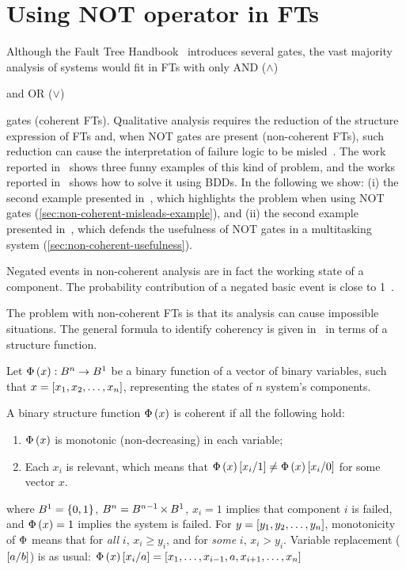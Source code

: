 \documentclass[en,twoside,onehalfspacing,phd]{risethesis}
\def\FThandbook{Fault Tree Handbook~\cite{VGR+1981}\index{Fault Tree!Handbook}%
  \gdef\FThandbook{Fault Tree Handbook\index{Fault Tree!Handbook}\xspace}%
  \xspace}
\def\ortext{OR ($\lor$)%
  \gdef\ortext{OR\xspace}%
  \xspace
}
\def\andtext{AND ($\land$)%
  \gdef\andtext{AND\xspace}%
  \xspace
}
\newcommand{\setsin}[1]{\ensuremath\left\{ #1 \right\}}
\newcommand{\parsin}[1]{\ensuremath\left( #1 \right)}
\newcommand{\squaresin}[1]{\ensuremath\left[ #1 \right]}
\def\cartesian{\ensuremath\operatorname{\times}}
\def\ftcoherencyop{\ensuremath\operatorname{\Phi}}
\newcommand{\ftcoherency}[1]{\ensuremath\ftcoherencyop\parsin{#1}}
\newcommand{\replace}[2]{\ensuremath\squaresin{#1\middle/#2}}
\begin{document}
\section[Using NOT operator in fault trees]{Using NOT operator in \aclp*{FT}}
\label{sec:not-operator}

Although the \FThandbook introduces several gates, the vast majority analysis of systems would fit in \acp{FT} with only \andtext and \ortext gates (coherent \acp{FT}).
Qualitative analysis requires the reduction of the structure expression of \acp{FT} and, when NOT gates are present (non-coherent \acp{FT}), such reduction can cause the interpretation of failure logic to be misled~\cite{Andrews2001,Oliv2006,AB2003,CCR2008,Vaurio2016}.
The work reported in~\cite{Oliv2006} shows three funny examples of this kind of problem, and the works reported in~\cite{Andrews2001,Oliv2006,CCR2008} shows how to solve it using \acp{BDD}.
In the following we show: (i) the second example presented in~\cite{Oliv2006}, which highlights the problem when using NOT gates (\cref{sec:non-coherent-misleads-example}), and (ii) the second example presented in~\cite{Andrews2001}, which defends the usefulness of NOT gates in a multitasking system (\cref{sec:non-coherent-usefulness}).

Negated events in non-coherent analysis are in fact the working state of a component.
The probability contribution of a negated basic event is close to 1~\cite{Andrews2001,CCR2008}.

The problem with non-coherent \acp{FT} is that its analysis can cause impossible situations.
The general formula to identify coherency is given in~\cite{Andrews2001,CCR2008} in terms of a structure function.

\begin{Def}[\ac{FT} Coherency]
\label{def:ft-coherency}
Let $\ftcoherency{x}:B^n \rightarrow B^1$ be a binary function of a vector of binary variables, such that $x = \squaresin{x_1, x_2,\ldots,x_n}$, representing the states of $n$ system's components.

A binary structure function $\ftcoherency{x}$ is coherent if all the following hold:
\begin{enumerate}
  \item $\ftcoherency{x}$ is monotonic (non-decreasing) in each variable;
  \item Each $x_i$ is relevant, which means that $\ftcoherency{x}\replace{x_i}{1} \neq \ftcoherency{x}\replace{x_i}{0}$ for some vector $x$.
\end{enumerate}
\end{Def}
%
\noindent where $B^1 = \setsin{0,1}$, $B^n = B^{n-1} \cartesian B^1$, $x_i = 1$ implies that component $i$ is failed, and $\ftcoherency{x} = 1$ implies the system is failed.
For $y = \squaresin{y_1,y_2,\ldots,y_n}$, monotonicity of $\ftcoherencyop$ means that for \emph{all} $i$, $x_i \ge y_i$, and for \emph{some} $i$, $x_i > y_i$.
Variable replacement ($\replace{a}{b}$) is as usual:
$\ftcoherency{x}\replace{x_i}{a} = \squaresin{x_1, \ldots, x_{i-1}, a, x_{i+1}, \ldots, x_n}$
\end{document}
